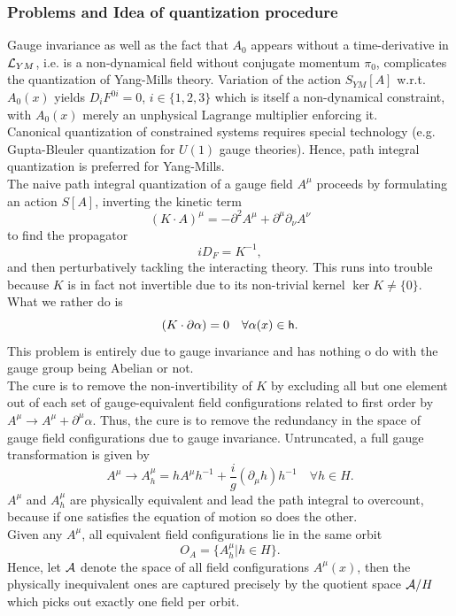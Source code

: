 \subsubsection{Problems and Idea of quantization procedure}
Gauge invariance as well as the fact that $A_0$ appears without a time-derivative in $\mathcal{L}_{YM}$, i.e. is a non-dynamical field without conjugate momentum $\pi_0$, complicates the quantization of Yang-Mills theory. Variation of the action $S_{YM}[A]$ w.r.t. $A_0(x)$ yields $D_i F^{0i}=0$, $i\in \{1,2,3\}$ which is itself a non-dynamical constraint, with $A_0(x)$ merely an unphysical Lagrange multiplier enforcing it.\\
Canonical quantization of constrained systems requires special technology (e.g. Gupta-Bleuler quantization for $U(1)$ gauge theories). Hence, path integral quantization is preferred for Yang-Mills. \\
The naive path integral quantization of a gauge field $A^\mu$ proceeds by formulating an action $S[A]$, inverting the kinetic term 
\begin{equation*}
	(K\cdot A)^\mu = - \partial^2 A^\mu + \partial^\mu \partial_\nu A^\nu 
\end{equation*}
to find the propagator
\begin{equation}
i D_F = K^{-1},
\end{equation}
and then perturbatively tackling the interacting theory. This runs into trouble because $K$ is in fact not invertible due to its non-trivial kernel $\ker K \neq \{0\}$.\\
What we rather do is
\begin{equation}
	(K\cdot \partial \alpha) = 0 \quad \forall \alpha(x) \in \mathsf{h}.
\end{equation}
This problem is entirely due to gauge invariance and has nothing o do with the gauge group being Abelian or not.\\
The cure is to remove the non-invertibility of $K$ by excluding all but one element out of each set of gauge-equivalent field configurations related to first order by $A^\mu \rightarrow A^\mu + \partial^\mu \alpha$. Thus, the cure is to remove the redundancy in the space of gauge field configurations due to gauge invariance. Untruncated, a full gauge transformation is given by
 \begin{equation}
 A^\mu \rightarrow A^\mu_{h} = h A^\mu h^{-1} + \frac{i}{g} (\partial_\mu h) h^{-1} \quad \forall h\in H.
 \end{equation}
 $A^\mu$ and $A^\mu_h$ are physically equivalent and lead the path integral to overcount, because if one satisfies the equation of motion so does the other.\\
 Given any $A^\mu$, all equivalent field configurations lie in the same orbit
 \begin{equation}
 	O_A = \{A^\mu_h | h \in H \}.
 \end{equation}
 Hence, let $\mathcal{A}$ denote the space of all field configurations $A^\mu(x)$, then the physically inequivalent ones are captured precisely by the quotient space $\mathcal{A}/H$ which picks out exactly one field per orbit.
